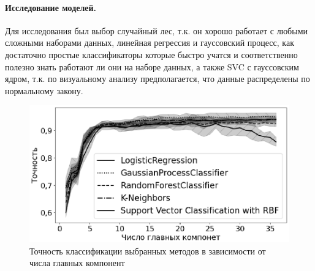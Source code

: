 \documentclass[a4paper, 12pt]{article}
\begin{document}
\paragraph{Исследование моделей.}Для исследования был выбор случайный лес, т.к. он хорошо работает с любыми сложными наборами данных, линейная регрессия и гауссовский процесс, как достаточно простые классификаторы которые быстро учатся и соответственно полезно знать работают ли они на наборе данных, а также SVC с гауссовским ядром, т.к. по визуальному анализу предполагается, что данные распределены по нормальному закону.


\begin{figure}[!htbp]
 \centering
 \includegraphics[width=\textwidth]{Accuracy.eps}
 \caption{Точность классификации выбранных методов в зависимости от числа главных компонент}
 \label{fig: Accuracy}
\end{figure}
\end{document}
